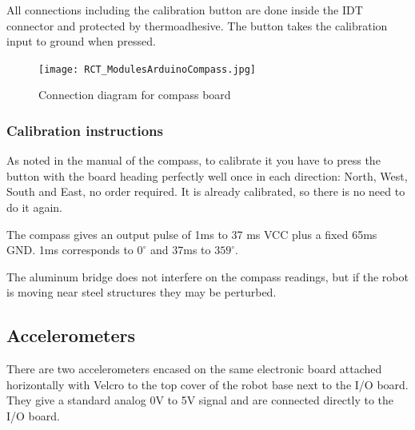 All connections including the calibration button are done inside the IDT
connector and protected by thermoadhesive. The button takes the calibration
input to ground when pressed.

\begin{figure}[htbp]
\begin{center}
 {\texttt{[image: RCT\_ModulesArduinoCompass.jpg]}}
\end{center}
\caption{Connection diagram for compass board}
\label{fig:ModulesArduinoCompass}
\end{figure}

\subsubsection{Calibration instructions}
As noted in the manual of the compass, to calibrate it you have to press the
button  with the board heading perfectly well once in each direction:
North, West, South and East, no order required. It is already calibrated, so
there is no need to do it again.

The compass gives an output pulse of 1ms to 37 ms \@ VCC plus a fixed 65ms \@
GND. 1ms corresponds to $0^\circ$ and 37ms to $359^\circ$. 

The aluminum bridge does not interfere on the compass readings, but if the
robot is moving near steel structures they may be perturbed.


\subsection{Accelerometers}
There are two accelerometers encased on the same electronic board attached
horizontally with Velcro to the top cover of the robot base next to the I/O board.
They give a standard analog 0V to 5V signal and are connected directly to the
I/O board.


